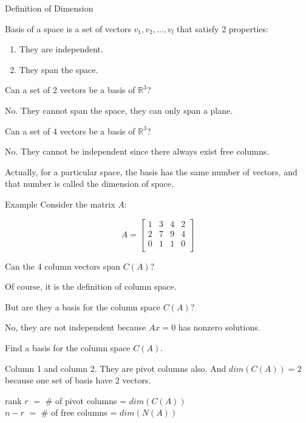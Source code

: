 \documentclass{beamer}
\begin{document}
\begin{frame}{Definition of Dimension}
\begin{definition}
Basis of a space is a set of vectors $v_1,v_2,...,v_l$ that satisfy 2 properties:
\begin{enumerate}
    \item They are independent.
    \item They span the space.
\end{enumerate}
\end{definition}

Can a set of 2 vectors be a basis of $\mathbb{R}^3$?

\vspace{3pt}
No. They cannot span the space, they can only span a plane.

\vspace{3pt}
Can a set of 4 vectors be a basis of $\mathbb{R}^3$?

\vspace{3pt}
No. They cannot be independent since there always exist free columns.

\vspace{3pt}
Actually, for a particular space, the basis has the same number of vectors, and that number is called the dimension of space.
\end{frame}

\begin{frame}{Example}
Consider the matrix $A$:

\begin{equation*}
    A=\left[ \begin{matrix}
        1&		3&		4&		2\\
        2&		7&		9&		4\\
        0&		1&		1&		0\\
    \end{matrix} \right]
\end{equation*}

Can the 4 column vectors span $C(A)$?

\vspace{3pt}
Of course, it is the definition of column space.

\vspace{3pt}
But are they a basis for the column space $C(A)$?

\vspace{3pt}
No, they are not independent because $Ax=0$ has nonzero solutions.

\vspace{3pt}
Find a basis for the column space $C(A)$.

\vspace{3pt}
Column 1 and column 2. They are pivot columns also. And $dim(C(A))=2$ because one set of basis have 2 vectors.

\begin{center}
    rank $r$ $=$ \# of pivot columns = $dim(C(A))$\\
    \vspace{3pt}
    $n-r$ $=$ \# of free columns = $dim(N(A))$
\end{center}

\end{frame}
\end{document}

